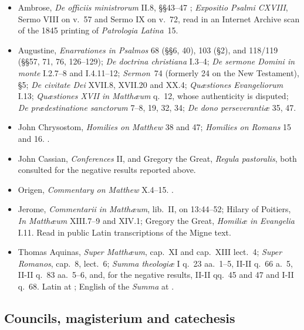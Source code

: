 \begin{itemize}
\item Ambrose, \emph{De officiis ministrorum} II.8, §§43--47 ; \emph{Expositio Psalmi CXVIII}, Sermo VIII on v.~57 and Sermo IX on v.~72, read in an Internet Archive scan of the 1845 printing of \emph{Patrologia Latina}~15.
\item Augustine, \emph{Enarrationes in Psalmos} 68 (§§6, 40), 103 (§2), and 118/119 (§§57, 71, 76, 126--129); \emph{De doctrina christiana} I.3--4; \emph{De sermone Domini in monte} I.2.7--8 and I.4.11--12; \emph{Sermon}~74 (formerly 24 on the New Testament), §5; \emph{De civitate Dei} XVII.8, XVII.20 and XX.4; \emph{Qu\ae stiones Evangeliorum} I.13; \emph{Qu\ae stiones XVII in Matth\ae um} q.~12, whose authenticity is disputed; \emph{De pr\ae destinatione sanctorum} 7--8, 19, 32, 34; \emph{De dono perseveranti\ae} 35, 47.
\item John Chrysostom, \emph{Homilies on Matthew} 38 and 47; \emph{Homilies on Romans} 15 and 16. .
\item John Cassian, \emph{Conferences} II, and Gregory the Great, \emph{Regula pastoralis}, both consulted for the negative results reported above.
\item Origen, \emph{Commentary on Matthew} X.4--15. .
\item Jerome, \emph{Commentarii in Matth\ae um}, lib.~II, on 13:44--52; Hilary of Poitiers, \emph{In Matth\ae um} XIII.7--9 and XIV.1; Gregory the Great, \emph{Homili\ae{} in Evangelia} I.11. Read in public Latin transcriptions of the Migne text.
\item Thomas Aquinas, \emph{Super Matth\ae um}, cap.~XI and cap.~XIII lect.~4; \emph{Super Romanos}, cap.~8, lect.~6; \emph{Summa theologi\ae} I q.~23 aa.~1--5, II-II q.~66 a.~5, II-II q.~83 aa.~5--6, and, for the negative results, II-II qq.~45 and 47 and I-II q.~68. Latin at ; English of the \emph{Summa} at .
\end{itemize}

\subsection*{Councils, magisterium and catechesis}

